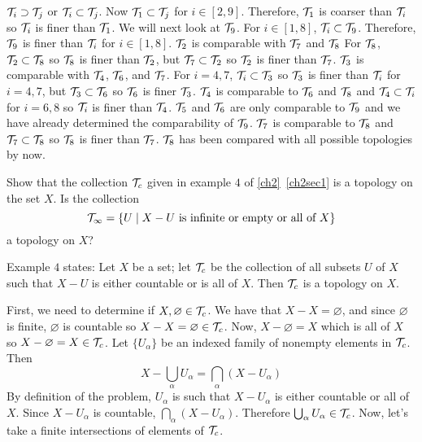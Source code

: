 \begin{exercise}
  \(\mathcal{T}_i\supset\mathcal{T}_j\) or \(\mathcal{T}_i\subset\mathcal{T}_j\).
  Now \(\mathcal{T}_1\subset\mathcal{T}_j\) for \(i\in[2,9]\).
  Therefore, \(\mathcal{T}_1\) is coarser than \(\mathcal{T}_i\) so \(\mathcal{T}_i\) is finer than
  \(\mathcal{T}_1\).
  We will next look at \(\mathcal{T}_9\).
  For \(i\in[1,8]\), \(\mathcal{T}_i\subset\mathcal{T}_9\).
  Therefore, \(\mathcal{T}_9\) is finer than \(\mathcal{T}_i\) for \(i\in[1,8]\).
  \(\mathcal{T}_2\) is comparable with \(\mathcal{T}_7\) and \(\mathcal{T}_8\)
  For \(\mathcal{T}_8\), \(\mathcal{T}_2\subset\mathcal{T}_8\) so \(\mathcal{T}_8\) is finer than
  \(\mathcal{T}_2\), but \(\mathcal{T}_7\subset\mathcal{T}_2\) so \(\mathcal{T}_2\) is finer than
  \(\mathcal{T}_7\).
  \(\mathcal{T}_3\) is comparable with \(\mathcal{T}_4\), \(\mathcal{T}_6\), and \(\mathcal{T}_7\).
  For \(i = 4,7\), \(\mathcal{T}_i\subset\mathcal{T}_3\) so \(\mathcal{T}_3\) is finer than
  \(\mathcal{T}_i\) for \(i = 4,7\), but \(\mathcal{T}_3\subset\mathcal{T}_6\) so \(\mathcal{T}_6\) is
  finer \(\mathcal{T}_3\).
  \(\mathcal{T}_4\) is comparable to \(\mathcal{T}_6\) and \(\mathcal{T}_8\) and
  \(\mathcal{T}_4\subset\mathcal{T}_i\) for \(i = 6,8\) so \(\mathcal{T}_i\) is finer than
  \(\mathcal{T}_4\).
  \(\mathcal{T}_5\) and \(\mathcal{T}_6\) are only comparable to \(\mathcal{T}_9\) and we have
  already determined the comparability of \(\mathcal{T}_9\).
  \(\mathcal{T}_7\) is comparable to \(\mathcal{T}_8\) and \(\mathcal{T}_7\subset\mathcal{T}_8\) so
  \(\mathcal{T}_8\) is finer than \(\mathcal{T}_7\).
  \(\mathcal{T}_8\) has been compared with all possible topologies by now.
\item
  Show that the collection \(\mathcal{T}_c\) given in example \(4\) of
  \cref{ch2}~\cref{ch2sec1} is a topology on the set \(X\).
  Is the collection
  \[
  \mathcal{T}_{\infty} =
  \{U\mid X - U\text{ is infinite or empty or all of } X\}
  \]
  a topology on \(X\)?
  \par\smallskip
  Example \(4\) states: Let \(X\) be a set; let \(\mathcal{T}_c\) be the collection of
  all subsets \(U\) of \(X\) such that \(X - U\) is either countable or is all
  of \(X\).
  Then \(\mathcal{T}_c\) is a topology on \(X\).
  \par\smallskip
  First, we need to determine if \(X,\varnothing\in\mathcal{T}_c\).
  We have that \(X - X = \varnothing\), and since \(\varnothing\) is finite,
  \(\varnothing\) is countable so \(X - X = \varnothing\in\mathcal{T}_c\).
  Now, \(X - \varnothing = X\) which is all of \(X\) so
  \(X - \varnothing = X\in\mathcal{T}_c\).
  Let \(\{U_{\alpha}\}\) be an indexed family of nonempty elements in
  \(\mathcal{T}_c\).
  Then
  \[
  X - \bigcup_{\alpha}U_{\alpha} = \bigcap_{\alpha}(X - U_{\alpha})
  \]
  By definition of the problem, \(U_{\alpha}\) is such that \(X - U_{\alpha}\)
  is either countable or all of \(X\).
  Since \(X - U_{\alpha}\) is countable, \(\bigcap_{\alpha}(X - U_{\alpha})\).
  Therefore \(\bigcup_{\alpha}U_{\alpha}\in\mathcal{T}_c\).
  Now, let's take a finite intersections of elements of \(\mathcal{T}_c\).

\end{exercise}
